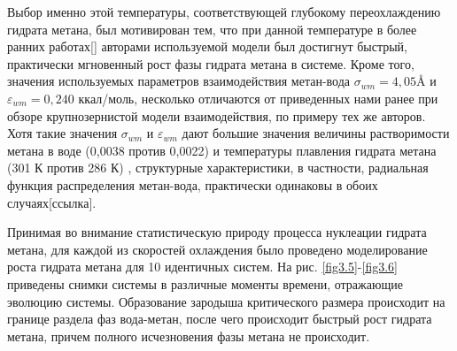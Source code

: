 Выбор именно этой температуры, соответствующей глубокому переохлаждению гидрата метана, был мотивирован тем, что при данной температуре в более ранних работах[] авторами используемой модели был достигнут быстрый, практически мгновенный рост фазы гидрата метана в системе. Кроме того, значения используемых параметров взаимодействия метан-вода $\sigma_{wm}=4,05 \si{\angstrom}$ и $\varepsilon_{wm}=0,240$ ккал/моль, несколько отличаются от приведенных нами ранее при обзоре крупнозернистой модели взаимодействия, по примеру тех же авторов. Хотя такие значения $\sigma_{wm}$ и $\varepsilon_{wm}$ дают большие значения величины растворимости метана в воде (0,0038 против 0,0022) и температуры плавления гидрата метана (301 К против 286 К) , структурные характеристики, в частности, радиальная функция распределения метан-вода, практически одинаковы в обоих случаях[ссылка].

Принимая во внимание статистическую природу процесса нуклеации гидрата метана, для каждой из скоростей охлаждения было проведено моделирование роста гидрата метана для 10 идентичных систем. На рис. \ref{fig3.5}-\ref{fig3.6} приведены снимки системы в различные моменты времени, отражающие эволюцию системы. Образование зародыша критического размера происходит на границе раздела фаз вода-метан, после чего происходит быстрый рост гидрата метана, причем полного исчезновения фазы метана не происходит.

